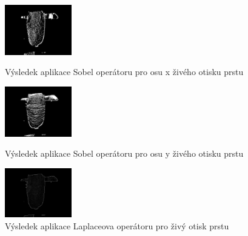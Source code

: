 \begin{figure}[!htbp]
  \begin{minipage}[b]{0.3\linewidth}
    \centering
    \includegraphics[width=110px]{obrazky-figures/sobelxlive.png}
    \caption{Výsledek aplikace Sobel operátoru pro osu x živého otisku prstu}
  \end{minipage}
  \hspace{0.3cm}
  \begin{minipage}[b]{0.3\linewidth}
    \centering
    \includegraphics[width=110px]{obrazky-figures/sobelylive.png}
    \caption{Výsledek aplikace Sobel operátoru pro osu y živého otisku prstu}
  \end{minipage}
  \hspace{0.3cm}
    \begin{minipage}[b]{0.3\linewidth}
    \centering
    \includegraphics[width=110px]{obrazky-figures/laplacianlive.png}
    \caption{Výsledek aplikace Laplaceova operátoru pro živý otisk prstu}
  \end{minipage}
\end{figure}

